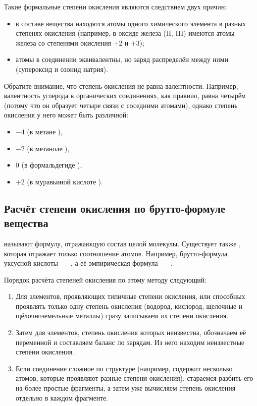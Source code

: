 Такие формальные степени окисления являются следствием двух причин:

\begin{itemize}
    \item в составе вещества находятся атомы одного химического элемента в разных степенях окисления (например, в оксиде железа (II, III)  имеются атомы железа со степенями окисления $+2$ и $+3$);
    \item атомы в соединении эквивалентны, но заряд распределён между ними (супероксид и озонид натрия).
\end{itemize}

Обратите внимание, что степень окисления не равна валентности. Например, валентность углерода в органических соединениях, как правило, равна четырём (потому что он образует четыре связи с соседними атомами), однако степень окисления у него может быть различной:

\begin{itemize}
    \item $-4$ (в метане ),
    \item $-2$ (в метаноле ),
    \item $0$ (в формальдегиде ),
    \item $+2$ (в муравьиной кислоте ).
\end{itemize}

\subsection*{Расчёт степени окисления по брутто-формуле вещества}

 называют формулу, отражающую состав целой молекулы. Существует также , которая отражает только соотношение атомов. Например, брутто-формула уксусной кислоты~--- , а её эмпирическая формула~--- .

Порядок расчёта степеней окисления по этому методу следующий:

\begin{enumerate}[label=\arabic*)]
    \item Для элементов, проявляющих типичные степени окисления, или способных проявлять только одну степень окисления (водород, кислород, щелочные и щёлочноземельные металлы) сразу записываем их степени окисления.
    \item Затем для элементов, степень окисления которых неизвестна, обозначаем её переменной и составляем баланс по зарядам. Из него находим неизвестные степени окисления.
    \item Если соединение сложное по структуре (например, содержит несколько атомов, которые проявляют разные степени окисления), стараемся разбить его на более простые фрагменты, а затем уже вычисляем степень окисления отдельно в каждом фрагменте.
\end{enumerate}

